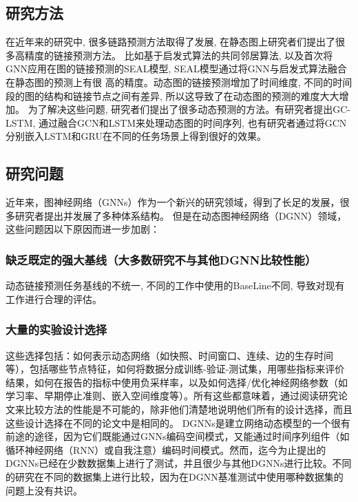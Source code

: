 \documentclass[conference]{IEEEtran}
\begin{document}
\subsection{研究方法}
在近年来的研究中, 很多链路预测方法取得了发展, 在静态图上研究者们提出了很多高精度的链接预测方法。
比如基于启发式算法的共同邻居算法\cite{papadopoulos2015network}, 
以及首次将GNN应用在图的链接预测的SEAL模型\cite{zhang2018link}, SEAL模型通过将GNN与启发式算法融合在静态图的预测上有很
高的精度。动态图的链接预测增加了时间维度, 不同的时间段的图的结构和链接节点之间有差异\cite{peng2021dynamic}, 所以这导致了在动态图的预测的难度大大增加。
为了解决这些问题, 研究者们提出了很多动态预测的方法。有研究者提出GC-LSTM\cite{chen2018gc}, 通过融合GCN和LSTM来处理动态图的时间序列, 
也有研究者通过将GCN分别嵌入LSTM和GRU\cite{pareja2020evolvegcn}在不同的任务场景上得到很好的效果。


\subsection{研究问题}

近年来，图神经网络（GNNs）作为一个新兴的研究领域，得到了长足的发展，很多研究者提出并发展了多种体系结构\cite{zhang2019graph}。
但是在动态图神经网络（DGNN）领域，这些问题因以下原因而进一步加剧：


\subsubsection{缺乏既定的强大基线（大多数研究不与其他DGNN比较性能）}
动态链接预测任务基线的不统一, 不同的工作中使用的BaseLine不同, 导致对现有工作进行合理的评估。
\subsubsection{大量的实验设计选择}
这些选择包括：如何表示动态网络（如快照、时间窗口、连续、边的生存时间等），包括哪些节点特征，如何将数据分成训练-验证-测试集，用哪些指标来评价结果，如何在报告的指标中使用负采样率，以及如何选择/优化神经网络参数（如学习率、早期停止准则、嵌入空间维度等）。所有这些都意味着，通过阅读研究论文来比较方法的性能是不可能的，除非他们清楚地说明他们所有的设计选择，而且这些设计选择在不同的论文中是相同的。
DGNNs是建立网络动态模型的一个很有前途的途径，因为它们既能通过GNNs编码空间模式，又能通过时间序列组件（如循环神经网络（RNN）或自我注意）编码时间模式。然而，迄今为止提出的DGNNs已经在少数数据集上进行了测试，并且很少与其他DGNNs进行比较。不同的研究在不同的数据集上进行比较，因为在DGNN基准测试中使用哪种数据集的问题上没有共识。
\end{document}
